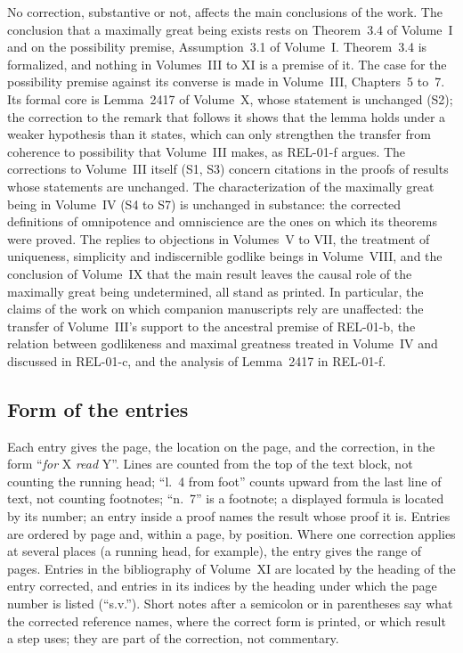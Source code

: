 \documentclass{situationist-preprint}
\begin{document}
No correction, substantive or not, affects the main conclusions of the work. The conclusion that a maximally great being exists rests on Theorem~3.4 of Volume~I and on the possibility premise, Assumption~3.1 of Volume~I. Theorem~3.4 is formalized, and nothing in Volumes~III to XI is a premise of it. The case for the possibility premise against its converse is made in Volume~III, Chapters~5 to~7. Its formal core is Lemma~2417 of Volume~X, whose statement is unchanged (S2); the correction to the remark that follows it shows that the lemma holds under a weaker hypothesis than it states, which can only strengthen the transfer from coherence to possibility that Volume~III makes, as REL-01-f argues. The corrections to Volume~III itself (S1, S3) concern citations in the proofs of results whose statements are unchanged. The characterization of the maximally great being in Volume~IV (S4 to S7) is unchanged in substance: the corrected definitions of omnipotence and omniscience are the ones on which its theorems were proved. The replies to objections in Volumes~V to VII, the treatment of uniqueness, simplicity and indiscernible godlike beings in Volume~VIII, and the conclusion of Volume~IX that the main result leaves the causal role of the maximally great being undetermined, all stand as printed. In particular, the claims of the work on which companion manuscripts rely are unaffected: the transfer of Volume~III's support to the ancestral premise of REL-01-b, the relation between godlikeness and maximal greatness treated in Volume~IV and discussed in REL-01-c, and the analysis of Lemma~2417 in REL-01-f.

\subsection{Form of the entries}

Each entry gives the page, the location on the page, and the correction, in the form \enquote{\textit{for} X \textit{read} Y}. Lines are counted from the top of the text block, not counting the running head; \enquote{l.~4 from foot} counts upward from the last line of text, not counting footnotes; \enquote{n.~7} is a footnote; a displayed formula is located by its number; an entry inside a proof names the result whose proof it is. Entries are ordered by page and, within a page, by position. Where one correction applies at several places (a running head, for example), the entry gives the range of pages. Entries in the bibliography of Volume~XI are located by the heading of the entry corrected, and entries in its indices by the heading under which the page number is listed (\enquote{s.v.}). Short notes after a semicolon or in parentheses say what the corrected reference names, where the correct form is printed, or which result a step uses; they are part of the correction, not commentary.
\end{document}
